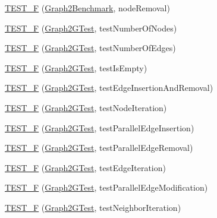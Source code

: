 \begin{DoxyCompactItemize}
\item 
\hyperlink{namespace_ensemble_clustering_ad9d734d066ebd6c530fa7e918f6a6ecd}{T\-E\-S\-T\-\_\-\-F} (\hyperlink{class_ensemble_clustering_1_1_graph2_benchmark}{Graph2\-Benchmark}, node\-Removal)
\item 
\hyperlink{namespace_ensemble_clustering_a9d8cfa7da6c170f4e5ad2c2f4f144401}{T\-E\-S\-T\-\_\-\-F} (\hyperlink{class_ensemble_clustering_1_1_graph2_g_test}{Graph2\-G\-Test}, test\-Number\-Of\-Nodes)
\item 
\hyperlink{namespace_ensemble_clustering_a0a2f23913ba3b51ecdcec2b513cd0bed}{T\-E\-S\-T\-\_\-\-F} (\hyperlink{class_ensemble_clustering_1_1_graph2_g_test}{Graph2\-G\-Test}, test\-Number\-Of\-Edges)
\item 
\hyperlink{namespace_ensemble_clustering_a8617f948033f099168161aeecffa4406}{T\-E\-S\-T\-\_\-\-F} (\hyperlink{class_ensemble_clustering_1_1_graph2_g_test}{Graph2\-G\-Test}, test\-Is\-Empty)
\item 
\hyperlink{namespace_ensemble_clustering_a5f146c6052d82466b4c66953985b7a81}{T\-E\-S\-T\-\_\-\-F} (\hyperlink{class_ensemble_clustering_1_1_graph2_g_test}{Graph2\-G\-Test}, test\-Edge\-Insertion\-And\-Removal)
\item 
\hyperlink{namespace_ensemble_clustering_a5d5eda19956914ce40e94a9d8899d7c7}{T\-E\-S\-T\-\_\-\-F} (\hyperlink{class_ensemble_clustering_1_1_graph2_g_test}{Graph2\-G\-Test}, test\-Node\-Iteration)
\item 
\hyperlink{namespace_ensemble_clustering_a849383f8eadcd9ed764a1f366ed54fa9}{T\-E\-S\-T\-\_\-\-F} (\hyperlink{class_ensemble_clustering_1_1_graph2_g_test}{Graph2\-G\-Test}, test\-Parallel\-Edge\-Insertion)
\item 
\hyperlink{namespace_ensemble_clustering_a4437b6fad6fb2c34eaf450bb0061a6bc}{T\-E\-S\-T\-\_\-\-F} (\hyperlink{class_ensemble_clustering_1_1_graph2_g_test}{Graph2\-G\-Test}, test\-Parallel\-Edge\-Removal)
\item 
\hyperlink{namespace_ensemble_clustering_ac6b779cc785ef37bcf1955dcaf53bbf3}{T\-E\-S\-T\-\_\-\-F} (\hyperlink{class_ensemble_clustering_1_1_graph2_g_test}{Graph2\-G\-Test}, test\-Edge\-Iteration)
\item 
\hyperlink{namespace_ensemble_clustering_ae856a1cb83a7514943ae105625066185}{T\-E\-S\-T\-\_\-\-F} (\hyperlink{class_ensemble_clustering_1_1_graph2_g_test}{Graph2\-G\-Test}, test\-Parallel\-Edge\-Modification)
\item 
\hyperlink{namespace_ensemble_clustering_a61946db1dd9dcde6094d41782177320f}{T\-E\-S\-T\-\_\-\-F} (\hyperlink{class_ensemble_clustering_1_1_graph2_g_test}{Graph2\-G\-Test}, test\-Neighbor\-Iteration)

\end{DoxyCompactItemize}
